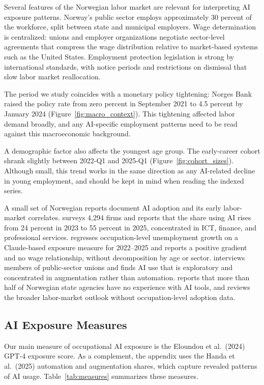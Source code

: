 Several features of the Norwegian labor market are relevant for interpreting AI exposure patterns. Norway's public sector employs approximately 30 percent of the workforce, split between state and municipal employers. Wage determination is centralized: unions and employer organizations negotiate sector-level agreements that compress the wage distribution relative to market-based systems such as the United States. Employment protection legislation is strong by international standards, with notice periods and restrictions on dismissal that slow labor market reallocation.

The period we study coincides with a monetary policy tightening: Norges Bank raised the policy rate from zero percent in September 2021 to 4.5 percent by January 2024 (Figure~\ref{fig:macro_context}). This tightening affected labor demand broadly, and any AI-specific employment patterns need to be read against this macroeconomic background.

A demographic factor also affects the youngest age group. The early-career cohort shrank slightly between 2022-Q1 and 2025-Q1 (Figure~\ref{fig:cohort_sizes}). Although small, this trend works in the same direction as any AI-related decline in young employment, and should be kept in mind when reading the indexed series.

A small set of Norwegian reports document AI adoption and its early labor-market correlates. \citet{samfunnsok2026} surveys 4{,}294 firms and reports that the share using AI rises from 24 percent in 2023 to 55 percent in 2025, concentrated in ICT, finance, and professional services. \citet{menon2026} regresses occupation-level unemployment growth on a Claude-based exposure measure for 2022--2025 and reports a positive gradient and no wage relationship, without decomposition by age or sector. \citet{nifu2024} interviews members of public-sector unions and finds AI use that is exploratory and concentrated in augmentation rather than automation. \citet{riksrevisjonen2024} reports that more than half of Norwegian state agencies have no experience with AI tools, and \citet{nav2025} reviews the broader labor-market outlook without occupation-level adoption data.


\subsection{AI Exposure Measures}\label{sec:data:ai}

Our main measure of occupational AI exposure is the Eloundou et al.\ (2024) GPT-4 exposure score. As a complement, the appendix uses the Handa et al.\ (2025) automation and augmentation shares, which capture revealed patterns of AI usage. Table~\ref{tab:measures} summarizes these measures.

